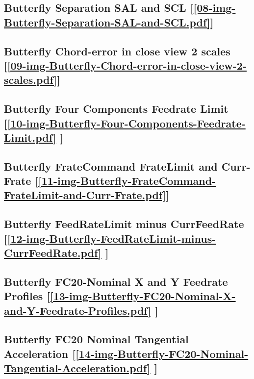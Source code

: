 \subsection       {Butterfly Separation SAL and SCL
	[\ref      {08-img-Butterfly-Separation-SAL-and-SCL.pdf}] }
\label{ssec-08-img-Butterfly-Separation-SAL-and-SCL.pdf}

\subsection       {Butterfly Chord-error in close view 2 scales
	[\ref      {09-img-Butterfly-Chord-error-in-close-view-2-scales.pdf}] }
\label{ssec-09-img-Butterfly-Chord-error-in-close-view-2-scales.pdf}

\subsection       {Butterfly Four Components Feedrate Limit
	[\ref      {10-img-Butterfly-Four-Components-Feedrate-Limit.pdf} ] }
\label{ssec-10-img-Butterfly-Four-Components-Feedrate-Limit.pdf}

\subsection    {Butterfly FrateCommand FrateLimit and Curr-Frate
	[\ref      {11-img-Butterfly-FrateCommand-FrateLimit-and-Curr-Frate.pdf}] }
\label{ssec-11-img-Butterfly-FrateCommand-FrateLimit-and-Curr-Frate.pdf}

\subsection     {Butterfly FeedRateLimit minus CurrFeedRate
	[\ref      {12-img-Butterfly-FeedRateLimit-minus-CurrFeedRate.pdf} ] }
\label{ssec-12-img-Butterfly-FeedRateLimit-minus-CurrFeedRate.pdf}

\subsection     {Butterfly FC20-Nominal X and Y Feedrate Profiles
	[\ref      {13-img-Butterfly-FC20-Nominal-X-and-Y-Feedrate-Profiles.pdf} ] }
\label{ssec-13-img-Butterfly-FC20-Nominal-X-and-Y-Feedrate-Profiles.pdf}

\subsection     {Butterfly FC20 Nominal Tangential Acceleration
	[\ref      {14-img-Butterfly-FC20-Nominal-Tangential-Acceleration.pdf} ] }
\label{ssec-14-img-Butterfly-FC20-Nominal-Tangential-Acceleration.pdf}

